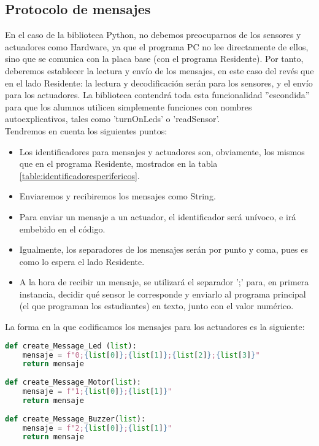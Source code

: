 \subsection{Protocolo de mensajes}\label{subsec:mensajesPython}
En el caso de la biblioteca Python, no debemos preocuparnos de los sensores y actuadores como Hardware, ya que el programa PC no lee directamente de ellos, sino que se comunica con la placa base (con el programa Residente). Por tanto, deberemos establecer la lectura y envío de los mensajes, en este caso del revés que en el lado Residente: la lectura y decodificación serán para los sensores, y el envío para los actuadores. La biblioteca contendrá toda esta funcionalidad ''escondida'' para que los alumnos utilicen simplemente funciones con nombres autoexplicativos, tales como 'turnOnLeds' o 'readSensor'.\\
Tendremos en cuenta los siguientes puntos:
\begin{itemize}
	\item Los identificadores para mensajes y actuadores son, obviamente, los mismos que en el programa Residente, mostrados en la tabla \ref{table:identificadoresperifericos}.
	\item Enviaremos y recibiremos los mensajes como String.
	\item Para enviar un mensaje a un actuador, el identificador será unívoco, e irá embebido en el código.
	\item Igualmente, los separadores de los mensajes serán por punto y coma, pues es como lo espera el lado Residente.
	\item A la hora de recibir un mensaje, se utilizará el separador ';' para, en primera instancia, decidir qué sensor le corresponde y enviarlo al programa principal (el que programan los estudiantes) en texto, junto con el valor numérico.
\end{itemize}
La forma en la que codificamos los mensajes para los actuadores es la siguiente:
\begin{lstlisting}[language=python,caption={Funciones en la biblioteca PC para la codificación de mensajes de los actuadores},captionpos=b]
def create_Message_Led (list):
	mensaje = f"0;{list[0]};{list[1]};{list[2]};{list[3]}"
	return mensaje
	
def create_Message_Motor(list):
	mensaje = f"1;{list[0]};{list[1]}"
	return mensaje
	
def create_Message_Buzzer(list):
	mensaje = f"2;{list[0]};{list[1]}"
	return mensaje
\end{lstlisting}

